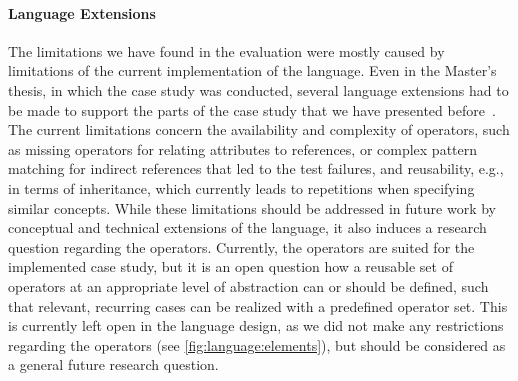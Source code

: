 \paragraph{Language Extensions}
The limitations we have found in the evaluation were mostly caused by limitations of the current implementation of the \commonalities language.
Even in the Master's thesis, in which the case study was conducted, several language extensions had to be made to support the parts of the case study that we have presented before~.
The current limitations concern the availability and complexity of operators, such as missing operators for relating attributes to references, or complex pattern matching for indirect references that led to the test failures, and reusability, e.g., in terms of inheritance, which currently leads to repetitions when specifying similar concepts.
While these limitations should be addressed in future work by conceptual and technical extensions of the \commonalities language, it also induces a research question regarding the operators.
Currently, the operators are suited for the implemented case study, but it is an open question how a reusable set of operators at an appropriate level of abstraction can or should be defined, such that relevant, recurring cases can be realized with a predefined operator set.
This is currently left open in the language design, as we did not make any restrictions regarding the operators (see \autoref{fig:language:elements}), but should be considered as a general future research question.




